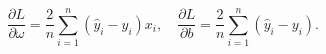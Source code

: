 \begin{equation}
    \frac{\partial L}{\partial \omega} = \frac{2}{n}\sum\limits_{i=1}^n(\hat{y}_i-y_i)x_i,
    \quad
    \frac{\partial L}{\partial b} = \frac{2}{n} \sum\limits_{i=1}^n(\hat{y}_i-y_i).
    \label{eq:grad}
\end{equation}